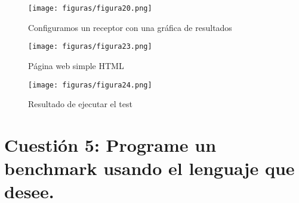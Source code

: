\begin{figure}[H] %
	\centering
	\texttt{[image: figuras/figura20.png]}  %
	
	
	\caption{Configuramos un receptor con una gráfica de resultados}
	\label{figura20}
\end{figure}

\begin{figure}[H] %
	\centering
	\texttt{[image: figuras/figura23.png]}  %
	
	
	\caption{Página web simple HTML}
	\label{figura23}
\end{figure}

\begin{figure}[H] %
	\centering
	\texttt{[image: figuras/figura24.png]}  %
	
	
	\caption{Resultado de ejecutar el test}
	\label{figura24}
\end{figure}


\section{Cuestión 5: Programe un benchmark usando el lenguaje que desee.}


